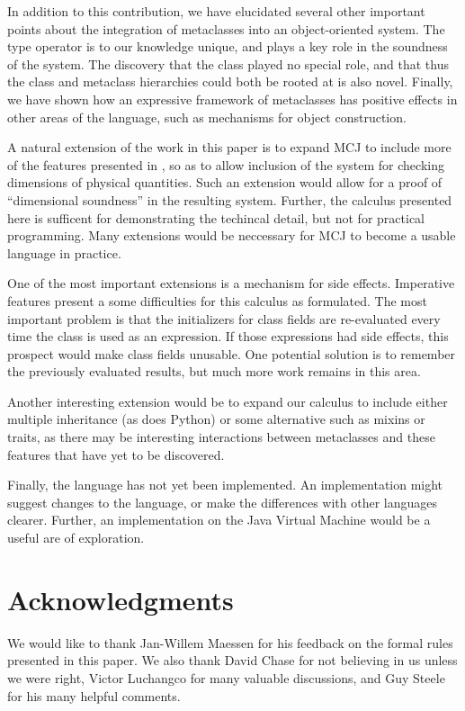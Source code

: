 \documentclass{acm-sigplan}
\begin{document}
In addition to this contribution, we have elucidated several other
important points about the integration of metaclasses into an
object-oriented system.  The {} type operator is to our
knowledge unique, and plays a key role in the soundness of the
system.  The discovery that the {} class played no special
role, and that thus the class and metaclass hierarchies could both be
rooted at {} is also novel.  Finally, we have shown how an
expressive framework of metaclasses has positive effects in other
areas of the language, such as mechanisms for object construction.  

A natural extension of the work in this paper is to expand MCJ to
include more of the features presented in \cite{DimUnits}, so as to
allow inclusion of the system for checking dimensions of physical
quantities. Such an extension would allow for a proof of  ``dimensional
soundness'' in the resulting system.  Further, the calculus presented
here is sufficent for demonstrating the techincal detail, but not for
practical programming.  Many extensions would be neccessary for MCJ to
become a usable language in practice.

One of the most important extensions is a mechanism for side effects.
Imperative features present a some difficulties for this calculus as
formulated.  The most important problem is that the initializers for
class fields are re-evaluated every time the class is used as an
expression.  If those expressions had side effects, this prospect
would make class fields unusable.  One potential solution is to
remember the previously evaluated results, but much more work remains
in this area.

Another interesting extension would be to expand our calculus to
include either multiple inheritance (as does Python) or some
alternative such as mixins or traits, as there may be interesting
interactions between metaclasses and these features that have yet to
be discovered.

Finally, the language has not yet been implemented.  An implementation
might suggest changes to the language, or make the differences with
other languages clearer.  Further, an implementation on the Java
Virtual Machine would be a useful are of exploration.

\section*{Acknowledgments}

We would like to thank Jan-Willem Maessen for his 
feedback on the formal rules presented in this paper.  We also thank
David Chase for not believing in us unless we were right, Victor
Luchangco for many valuable discussions, and Guy Steele for his many
helpful comments.




\end{document}
